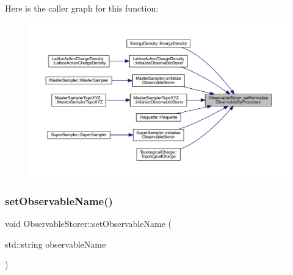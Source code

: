 Here is the caller graph for this function\+:
\nopagebreak
\begin{figure}[H]
\begin{center}
\leavevmode
\includegraphics[width=350pt]{class_observable_storer_a6177ade7609fb0e4b739955eecba20e6_icgraph}
\end{center}
\end{figure}
\mbox{\label{class_observable_storer_a7f4847c4fdbf8764d8f07950c4d4b62a}} 
\subsubsection{\texorpdfstring{setObservableName()}{setObservableName()}}
{\footnotesize\ttfamily void Observable\+Storer\+::set\+Observable\+Name (\begin{DoxyParamCaption}\item[{std\+::string}]{observable\+Name }\end{DoxyParamCaption})\hspace{0.3cm}{\ttfamily [inline]}}

